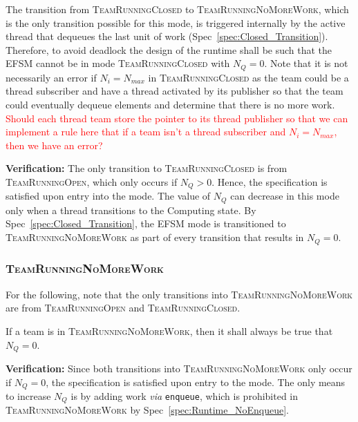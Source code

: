 \documentclass{article}
\newcommand{\TeamRunningOpen}   {\textsc{TeamRunningOpen}}
\newcommand{\TeamRunningClosed} {\textsc{TeamRunningClosed}}
\newcommand{\TeamRunningNoMoreWork} {\textsc{TeamRunningNoMoreWork}}
\begin{document}
\begin{spec}
\label{spec:Closed_NoWork}
The transition from {\TeamRunningClosed} to \TeamRunningNoMoreWork, which is the
only transition possible for this mode, is triggered internally by the active
thread that dequeues the last unit of work (Spec~\ref{spec:Closed_Transition}).
Therefore, to avoid deadlock the design of the runtime shall be such that the
EFSM cannot be in mode {\TeamRunningClosed} with $N_Q = 0$.  Note that it is not
necessarily an error if $N_i = N_{max}$ in {\TeamRunningClosed} as the team
could be a thread subscriber and have a thread activated by its publisher so
that the team could eventually dequeue elements and determine that there is no
more work.
\textcolor{red}{Should each thread team store the pointer to its thread
publisher so that we can implement a rule here that if a team isn't a thread
subscriber and $N_i = N_{max}$, then we have an error?}
\end{spec}
\textbf{Verification:}\hspace{0.125in}  The only transition to
{\TeamRunningClosed} is from {\TeamRunningOpen}, which only occurs if $N_Q > 0$.
Hence, the specification is satisfied upon entry into the mode.  The value of
$N_Q$ can decrease in this mode only when a thread transitions to the Computing
state.   By Spec~\ref{spec:Closed_Transition}, the EFSM mode is transitioned to
{\TeamRunningNoMoreWork} as part of every transition that results in $N_Q = 0$.

\subsubsection{\TeamRunningNoMoreWork}
For the following, note that the only transitions into {\TeamRunningNoMoreWork}
are from {\TeamRunningOpen} and \TeamRunningClosed.

\begin{spec}
\label{spec:NoMoreWork_NoWork}
If a team is in \TeamRunningNoMoreWork, then it shall always be true that $N_Q =
0$.
\end{spec}
\textbf{Verification:}\hspace{0.125in}  
Since both transitions into {\TeamRunningNoMoreWork} only occur if $N_Q = 0$,
the specification is satisfied upon entry to the mode.  The only means to
increase $N_Q$ is by adding work \textit{via} \texttt{enqueue}, which is
prohibited in {\TeamRunningNoMoreWork} by Spec~\ref{spec:Runtime_NoEnqueue}.
\end{document}
